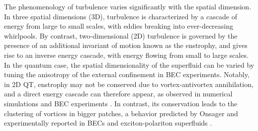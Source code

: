 \documentclass[aps,prl,twocolumn,showpacs,notitlepage,floatfix,superscriptaddress]{revtex4-1}
\begin{document}
The phenomenology of turbulence varies significantly with the spatial dimension. 
In three spatial dimensions (3D), turbulence is characterized by a cascade of energy from large to small scales, with eddies breaking into ever-decreasing whirlpools. By contrast, two-dimensional (2D) turbulence is governed by the presence of an additional invariant of motion known as the enstrophy, and gives rise to an inverse energy cascade, with energy flowing from small to large scales. 
In the quantum case, the spatial dimensionality of the superfluid can be varied by tuning the anisotropy of the external confinement in BEC experiments. 
Notably, in 2D 
QT, 
enstrophy may not be conserved due to vortex-antivortex annihilation, and a direct energy cascade can therefore appear, as observed in numerical simulations \cite{Numasato2010,Chesler13} and 
BEC experiments \cite{Zhao25}.
In contrast, its conservation leads to the clustering of vortices in bigger patches, 
a behavior predicted by Onsager and experimentally reported in 
BECs 
\cite{Gau19,Johnstone19}
and exciton-polariton superfluids \cite{Panico23}. 
\end{document}
